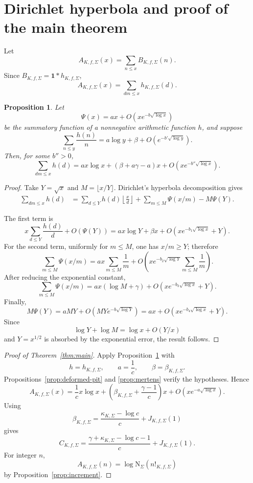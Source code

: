 \documentclass[11pt]{article}
\newtheorem{proposition}[theorem]{Proposition}
\newcommand{\Norm}{\mathrm N}
\begin{document}
\section{Dirichlet hyperbola and proof of the main theorem}

Let
\[
A_{K,f,\Sigma}(x)
=
\sum_{n\le x}B_{K,f,\Sigma}(n).
\]
Since \(B_{K,f,\Sigma}=\mathbf1*h_{K,f,\Sigma}\),
\[
A_{K,f,\Sigma}(x)
=
\sum_{dm\le x}h_{K,f,\Sigma}(d).
\]

\begin{proposition}\label{prop:hyperbola}
Let
\[
\Psi(x)=ax+O\!\left(xe^{-b\sqrt{\log x}}\right)
\]
be the summatory function of a nonnegative arithmetic function \(h\),
and suppose
\[
\sum_{n\le y}\frac{h(n)}n
=
a\log y+\beta
+
O\!\left(e^{-b'\sqrt{\log y}}\right).
\]
Then, for some \(b''>0\),
\[
\sum_{dm\le x}h(d)
=
ax\log x
+
(\beta+a\gamma-a)x
+
O\!\left(
xe^{-b''\sqrt{\log x}}
\right).
\]
\end{proposition}

\begin{proof}
Take \(Y=\sqrt{x}\) and \(M=\lfloor x/Y\rfloor\).  Dirichlet's
hyperbola decomposition gives
\begin{align*}
\sum_{dm\le x}h(d)
&=
\sum_{d\le Y}h(d)\left\lfloor\frac{x}{d}\right\rfloor
+
\sum_{m\le M}\Psi(x/m)
-
M\Psi(Y).
\end{align*}

The first term is
\[
x\sum_{d\le Y}\frac{h(d)}d+O(\Psi(Y))
=
ax\log Y+\beta x
+
O\!\left(
xe^{-b_1\sqrt{\log x}}+Y
\right).
\]
For the second term, uniformly for \(m\le M\), one has \(x/m\ge Y\);
therefore
\[
\sum_{m\le M}\Psi(x/m)
=
ax\sum_{m\le M}\frac1m
+
O\!\left(
x e^{-b_2\sqrt{\log Y}}
\sum_{m\le M}\frac1m
\right).
\]
After reducing the exponential constant,
\[
\sum_{m\le M}\Psi(x/m)
=
ax(\log M+\gamma)
+
O\!\left(
xe^{-b_3\sqrt{\log x}}+Y
\right).
\]
Finally,
\[
M\Psi(Y)
=
aMY
+
O\!\left(
MYe^{-b\sqrt{\log Y}}
\right)
=
ax
+
O\!\left(
xe^{-b_4\sqrt{\log x}}+Y
\right).
\]
Since
\[
\log Y+\log M
=
\log x+O(Y/x)
\]
and \(Y=x^{1/2}\) is absorbed by the exponential error, the result
follows.
\end{proof}

\begin{proof}[Proof of Theorem~\ref{thm:main}]
Apply Proposition~\ref{prop:hyperbola} with
\[
h=h_{K,f,\Sigma},
\qquad
a=\frac1c,
\qquad
\beta=\beta_{K,f,\Sigma}.
\]
Propositions~\ref{prop:deformed-pit} and \ref{prop:mertens} verify the
hypotheses.  Hence
\[
A_{K,f,\Sigma}(x)
=
\frac1c x\log x
+
\left(
\beta_{K,f,\Sigma}
+\frac{\gamma-1}{c}
\right)x
+
O\!\left(
xe^{-a\sqrt{\log x}}
\right).
\]
Using
\[
\beta_{K,f,\Sigma}
=
\frac{\kappa_{K,\Sigma}-\log c}{c}
+
J_{K,f,\Sigma}(1)
\]
gives
\[
C_{K,f,\Sigma}
=
\frac{\gamma+\kappa_{K,\Sigma}-\log c-1}{c}
+
J_{K,f,\Sigma}(1).
\]
For integer \(n\),
\[
A_{K,f,\Sigma}(n)
=
\log\Norm_\Sigma(n!_{K,f,\Sigma})
\]
by Proposition~\ref{prop:increment}.
\end{proof}
\end{document}
